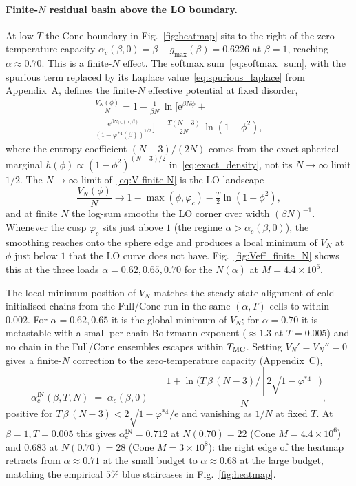 \documentclass[letterpaper]{article} %
\newcommand{\e}{{\mathrm{e}}}
\newcommand{\Bnet}{\beta}
\newcommand{\gmax}{g_{\max}}
\newcommand{\ac}{\alpha_c}
\begin{document}
\paragraph{Finite-$N$ residual basin above the LO boundary.}
At low $T$ the Cone boundary in Fig.~\ref{fig:heatmap} sits to the
right of the zero-temperature capacity
$\ac(\Bnet, 0) = \Bnet - \gmax(\Bnet) = 0.6226$ at $\Bnet = 1$,
reaching $\alpha \approx 0.70$.  This is a finite-$N$ effect.  The
softmax sum~\eqref{eq:softmax_sum}, with the spurious term replaced
by its Laplace value~\eqref{eq:spurious_laplace} from Appendix~A, defines the
finite-$N$ effective potential at fixed disorder,
\begin{multline}
\frac{V_N(\phi)}{N} = 1 - \tfrac{1}{\Bnet N}\,
   \ln\!\Big[\e^{\Bnet N \phi} +\\
            \frac{\e^{\Bnet N \varphi_c(\alpha, \Bnet)}}{(1-\varphi^{*4}(\Bnet))^{1/2}} \Big]
    - \tfrac{T(N-3)}{2N}\,\ln(1 - \phi^{2}),
\label{eq:V-finite-N}
\end{multline}
where the entropy coefficient $(N-3)/(2N)$ comes from the
exact spherical marginal $h(\phi) \propto (1-\phi^2)^{(N-3)/2}$
in~\eqref{eq:exact_density}, not its $N \to \infty$ limit
$1/2$.  The $N \to \infty$ limit of~\eqref{eq:V-finite-N} is the
LO landscape
\begin{equation}
    \frac{V_N(\phi)}{N} \to 1 -\max(\phi, \varphi_c) - \tfrac{T}{2}\ln(1-\phi^{2}),
\end{equation}
and at finite $N$ the log-sum smooths the LO corner over width
$(\Bnet N)^{-1}$.
Whenever the cusp $\varphi_c$ sits just above $1$ (the regime
$\alpha > \ac(\Bnet, 0)$), the smoothing reaches onto the sphere
edge and produces a local minimum of $V_N$ at $\phi$ just below
$1$ that the LO curve does not have.  Fig.~\ref{fig:Veff_finite_N}
shows this at the three loads $\alpha = 0.62, 0.65, 0.70$ for the
$N(\alpha)$ at $M = 4.4 \times 10^6$.

The local-minimum position of $V_N$ matches the steady-state
alignment of cold-initialised chains from the Full/Cone run in the
same $(\alpha, T)$ cells to within $0.002$.  For $\alpha = 0.62, 0.65$ it is the global minimum
of $V_N$; for $\alpha = 0.70$ it is metastable with a small
per-chain Boltzmann exponent ($\approx 1.3$ at $T = 0.005$) and no
chain in the Full/Cone ensembles escapes within $T_{\rm MC}$.  Setting
$V_N' = V_N'' = 0$ gives a finite-$N$ correction to the
zero-temperature capacity (Appendix~C),
\begin{equation}
\ac^{\mathrm{fN}}(\Bnet, T, N) \;=\; \ac(\Bnet, 0)
   \;-\; \frac{1 + \ln\!\big(T\,\Bnet\,(N-3) / [2\sqrt{1-\varphi^{*4}}]\big)}{N},
\label{eq:capacity_finiteN}
\end{equation}
positive for $T\,\Bnet\,(N-3) < 2\sqrt{1-\varphi^{*4}}/\e$ and
vanishing as $1/N$ at fixed $T$.  At $\Bnet = 1, T = 0.005$ this
gives $\ac^{\mathrm{fN}} = 0.712$ at $N(0.70) = 22$ (Cone
$M = 4.4 \times 10^6$) and $0.683$ at $N(0.70) = 28$ (Cone
$M = 3 \times 10^8$): the right edge of the heatmap retracts from
$\alpha \approx 0.71$ at the small budget to $\alpha \approx 0.68$
at the large budget, matching the empirical $5\%$ blue staircases in
Fig.~\ref{fig:heatmap}.
\end{document}
